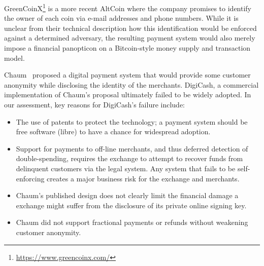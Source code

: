 \documentclass[sigconf, authordraft]{acmart}
\begin{document}
GreenCoinX\footnote{\url{https://www.greencoinx.com/}} is a more
recent AltCoin where the company promises to identify the owner of
each coin via e-mail addresses and phone numbers.  While it is unclear
from their technical description how this identification would be
enforced against a determined adversary, the resulting payment system
would also merely impose a financial panopticon on a Bitcoin-style
money supply and transaction model.


Chaum~\cite{chaum1983blind} proposed a digital payment system that
would provide some customer anonymity while disclosing the identity of
the merchants.  DigiCash, a commercial implementation of Chaum's
proposal ultimately failed to be widely adopted.  In our assessment,
key reasons for DigiCash's failure include:

\begin{itemize}
 \item The use of patents to protect the technology; a payment system
   should be free software (libre) to have a chance for widespread adoption.
 \item Support for payments to off-line merchants, and thus deferred
   detection of double-spending, requires the exchange to attempt to
   recover funds from delinquent customers via the legal system.
   Any system that fails to be self-enforcing creates a major
   business risk for the exchange and merchants.
 \item %
   Chaum's published design does not clearly
   limit the financial damage a exchange might suffer from the
   disclosure of its private online signing key.
 \item Chaum did not support fractional payments or refunds without
   weakening customer anonymity.
\end{itemize}
\end{document}
